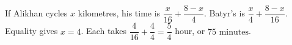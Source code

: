 If Alikhan cycles $x$ kilometres, his time is $\dfrac{x}{16}+\dfrac{8-x}{4}$. Batyr's is $\dfrac{x}{4}+\dfrac{8-x}{16}$. Equality gives $x=4$. Each takes $\dfrac{4}{16}+\dfrac{4}{4}=\dfrac{5}{4}$ hour, or $\boxed{75\text{ minutes}}$.
